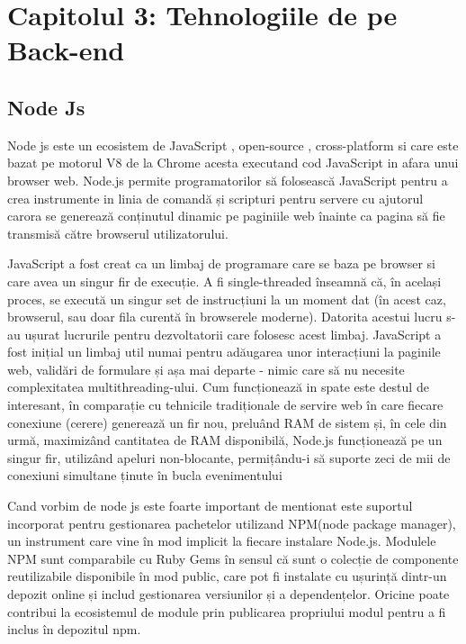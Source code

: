 \chapter{Capitolul 3: Tehnologiile de pe Back-end}
\label{chap:ch3}

\section{Node Js}
\label{sec:ch3sec1}

\par Node js este un ecosistem de JavaScript , open-source , cross-platform si care este bazat pe motorul V8 de la Chrome acesta executand cod JavaScript in afara unui browser web. Node.js permite programatorilor să folosească JavaScript pentru a crea instrumente in  linia de comandă și scripturi pentru servere  cu ajutorul carora se  generează conținutul dinamic pe paginiile web înainte ca pagina să fie transmisă către browserul utilizatorului.
\par JavaScript a fost creat ca un limbaj de programare care se baza pe browser si care avea un singur fir de execuție. A fi single-threaded înseamnă că, în același proces, se execută un singur set de instrucțiuni la un moment dat (în acest caz, browserul, sau doar fila curentă în browserele moderne). Datorita acestui lucru s-au ușurat lucrurile pentru dezvoltatorii care folosesc acest limbaj. JavaScript a fost inițial un limbaj util numai pentru adăugarea unor interacțiuni la paginile web, validări de formulare și așa mai departe - nimic care să nu necesite complexitatea multithreading-ului.
Cum funcționează in spate este destul de interesant, în comparație cu tehnicile tradiționale de servire web în care fiecare conexiune (cerere) generează un fir nou, preluând RAM de sistem și, în cele din urmă, maximizând cantitatea de RAM disponibilă, Node.js funcționează pe un singur fir, utilizând  apeluri non-blocante, permițându-i să suporte zeci de mii de conexiuni simultane ținute în bucla evenimentului
\par Cand vorbim de node js este foarte important de mentionat este suportul incorporat pentru gestionarea pachetelor utilizand NPM(node package manager), un instrument care vine în mod implicit la fiecare instalare Node.js. Modulele NPM sunt comparabile cu Ruby Gems în sensul că sunt o colecție de componente reutilizabile disponibile în mod public, care pot fi instalate cu ușurință dintr-un depozit online și includ gestionarea versiunilor și a dependențelor. Oricine poate contribui la ecosistemul de module prin publicarea propriului modul pentru a fi inclus în depozitul npm.

